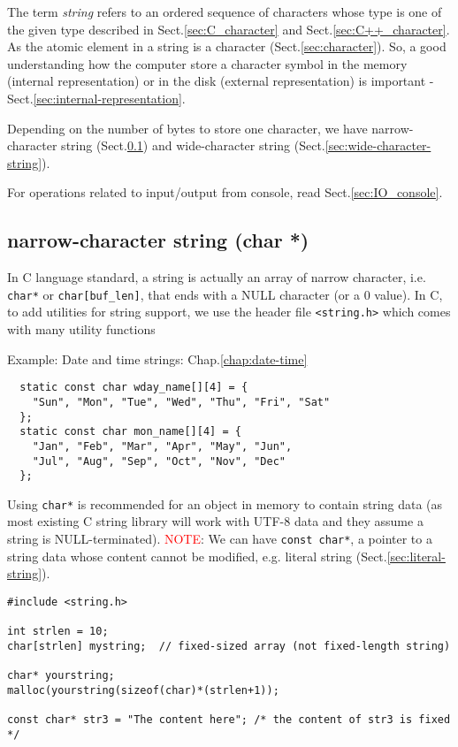 The term {\it string} refers to an ordered sequence of characters whose type
is one of the given type described in Sect.\ref{sec:C_character} and
Sect.\ref{sec:C++_character}. As the atomic element in a string is a character
(Sect.\ref{sec:character}). So, a good understanding how the computer store a
character symbol in the memory (internal representation) or in the disk
(external representation) is important - Sect.\ref{sec:internal-representation}.

Depending on the number of bytes to store one character, we have
narrow-character string (Sect.\ref{sec:narrow-character-string}) and
wide-character string (Sect.\ref{sec:wide-character-string}).

For operations related to
input/output from console, read Sect.\ref{sec:IO_console}.

\subsection{ narrow-character string (char *)}
\label{sec:narrow-character-string}

In C language standard, a string is actually an array of narrow character, i.e.
\verb!char*! or \verb!char[buf_len]!, that ends with a NULL character (or a 0
value).
In C, to add utilities for string support, we use the header file
\verb!<string.h>! which comes with many utility functions

Example: Date and time strings: Chap.\ref{chap:date-time}
\begin{verbatim}
  static const char wday_name[][4] = {
    "Sun", "Mon", "Tue", "Wed", "Thu", "Fri", "Sat"
  };
  static const char mon_name[][4] = {
    "Jan", "Feb", "Mar", "Apr", "May", "Jun",
    "Jul", "Aug", "Sep", "Oct", "Nov", "Dec"
  };
\end{verbatim}

Using \verb!char*! is recommended for an object in memory to contain string data
(as most existing C string library will work with UTF-8 data and they assume a
string is NULL-terminated). 
\textcolor{red}{NOTE}: We can have \verb!const char*!, a pointer to a string
data whose content cannot be modified, e.g. literal string
(Sect.\ref{sec:literal-string}).


\begin{verbatim}
#include <string.h>

int strlen = 10;
char[strlen] mystring;  // fixed-sized array (not fixed-length string)

char* yourstring;
malloc(yourstring(sizeof(char)*(strlen+1));

const char* str3 = "The content here"; /* the content of str3 is fixed */
\end{verbatim}


